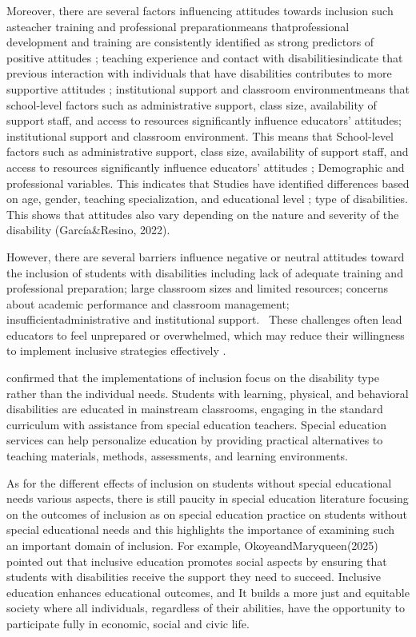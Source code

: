 \documentclass[10pt]{NSP1}
\begin{document}
Moreover, there are several factors influencing attitudes towards inclusion such asteacher training and professional preparationmeans thatprofessional development and training are consistently identified as strong predictors of positive attitudes \cite{1}; teaching experience and contact with disabilitiesindicate that previous interaction with individuals that have disabilities contributes to more supportive attitudes \cite{11}; institutional support and classroom environmentmeans that school-level factors such as administrative support, class size, availability of support staff, and access to resources significantly influence educators' attitudes; institutional support and classroom environment. This means that School-level factors such as administrative support, class size, availability of support staff, and access to resources significantly influence educators' attitudes \cite{21}; Demographic and professional variables. This indicates that Studies have identified differences based on age, gender, teaching specialization, and educational level \cite{11}; type of disabilities. This shows that attitudes also vary depending on the nature and severity of the disability (García\&Resino, 2022).

However, there are several barriers influence negative or neutral attitudes toward the inclusion of students with disabilities including lack of adequate training and professional preparation; large classroom sizes and limited resources; concerns about academic performance and classroom management; insufficientadministrative and institutional support. ~These challenges often lead educators to feel unprepared or overwhelmed, which may reduce their willingness to implement inclusive strategies effectively \cite{1}.~

\cite{2} confirmed that the implementations of inclusion focus on the disability type rather than the individual needs. Students with learning, physical, and behavioral disabilities are educated in mainstream classrooms, engaging in the standard curriculum with assistance from special education teachers. Special education services can help personalize education by providing practical alternatives to teaching materials, methods, assessments, and learning environments.

As for the different effects of inclusion on students without special educational needs various aspects, there is still paucity in special education literature focusing on the outcomes of inclusion as on special education practice on students without special educational needs and this highlights the importance of examining such an important domain of inclusion. For example, OkoyeandMaryqueen(2025) pointed out that inclusive education promotes social aspects by ensuring that students with disabilities receive the support they need to succeed. Inclusive education enhances educational outcomes, and It builds a more just and equitable society where all individuals, regardless of their abilities, have the opportunity to participate fully in economic, social and civic life.
\end{document}
